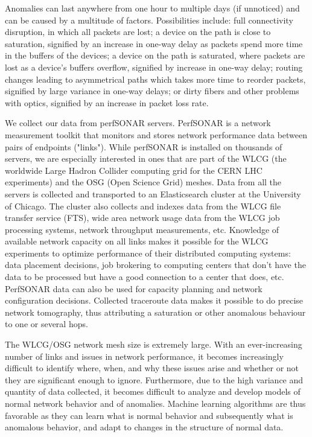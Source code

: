 \documentclass[5p]{elsarticle}
\begin{document}
Anomalies can last anywhere from one hour to multiple days (if unnoticed) and can be caused by a multitude of factors. Possibilities include: full connectivity disruption, in which all packets are lost; a device on the path is close to saturation, signified by an increase in one-way delay as packets spend more time in the buffers of the devices; a device on the path is saturated, where packets are lost as a device’s buffers overflow, signified by increase in one-way delay; routing changes leading to asymmetrical paths which takes more time to reorder packets, signified by large variance in one-way delays; or dirty fibers and other problems with optics, signified by an increase in packet loss rate.

We collect our data from perfSONAR \cite{jedan} servers. PerfSONAR is a network measurement toolkit that monitors and stores network performance data between pairs of endpoints ("links"). While perfSONAR is installed on thousands of servers, we are especially interested in ones that are part of the WLCG (the worldwide Large Hadron Collider computing grid for the CERN LHC experiments) and the OSG (Open Science Grid) meshes. Data from all the servers is collected and transported to an Elasticsearch cluster at the University of Chicago. The cluster also collects and indexes data from the WLCG file transfer service (FTS), wide area network usage data from the WLCG job processing systems, network throughput measurements, etc.  Knowledge of available network capacity on all links makes it possible for the WLCG experiments to optimize performance of their distributed computing systems: data placement decisions, job brokering to computing centers that don't have the data to be processed but have a good connection to a center that does, etc. PerfSONAR data can also be used for capacity planning and network configuration decisions. Collected traceroute data makes it possible to do precise network tomography, thus attributing a saturation or other anomalous behaviour to one or several hops.   

The WLCG/OSG network mesh size is extremely large. With an ever-increasing number of links and issues in network performance, it becomes increasingly difficult to identify where, when, and why these issues arise and whether or not they are significant enough to ignore. Furthermore, due to the high variance and quantity of data collected, it becomes difficult to analyze and develop models of normal network behavior and of anomalies. Machine learning algorithms are thus favorable as they can learn what is normal behavior and subsequently what is anomalous behavior, and adapt to changes in the structure of normal data.
\end{document}

